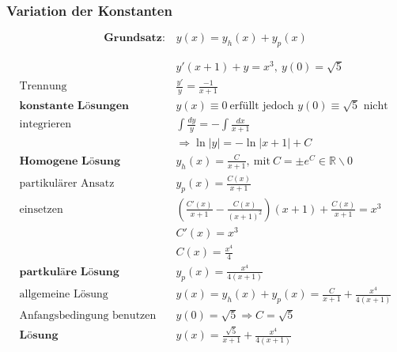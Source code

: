 \documentclass[11pt]{article}
\begin{document}
\clearpage

\subsubsection{Variation der Konstanten}

\begin{equation*}
	\textbf{Grundsatz:}\quad y(x) = y_h(x) + y_p(x)
\end{equation*}

\begin{equation*}
\begin{split}
	& y'(x+1) + y = x^3,\ y(0) = \sqrt{5} \\
	\text{Trennung}\quad & \frac{y'}{y} = \frac{-1}{x+1} \\
	\textbf{konstante L{\"o}sungen}\quad & y(x) \equiv 0\ \text{erf{\"u}llt jedoch $y(0) \equiv \sqrt{5}$ nicht} \\
	\text{integrieren}\quad & \int \frac{dy}{y} = - \int \frac{dx}{x+1} \\
	& \Rightarrow \ln|y| = -\ln|x+1| + C \\
	\textbf{Homogene L{\"o}sung} \quad & y_h(x) = \frac{C}{x+1},\ \text{mit}\ C= \pm e^C \in \mathbb{R}\backslash{0} \\
	\text{partikul{\"a}rer Ansatz}\quad & y_p(x) = \frac{C(x)}{x+1} \\
	\text{einsetzen} \quad & (\frac{C'(x)}{x+1} - \frac{C(x)}{(x+1)^2})(x+1) + \frac{C(x)}{x+1} = x^3 \\
	& C'(x) = x^3 \\
	& C(x) = \frac{x^4}{4} \\
	\textbf{partkul{\"a}re L{\"o}sung} \quad & y_p(x) = \frac{x^4}{4(x+1)} \\
	\text{allgemeine L{\"o}sung}\quad & y(x) = y_h(x) + y_p(x) = \frac{C}{x+1} + \frac{x^4}{4(x+1)} \\
	\text{Anfangsbedingung benutzen} \quad & y(0) = \sqrt{5} \Rightarrow C = \sqrt{5} \\
	\textbf{L{\"o}sung} \quad & y(x) = \frac{\sqrt{5}}{x+1} + \frac{x^4}{4(x+1)}
\end{split}
\end{equation*}

%
\end{document}
